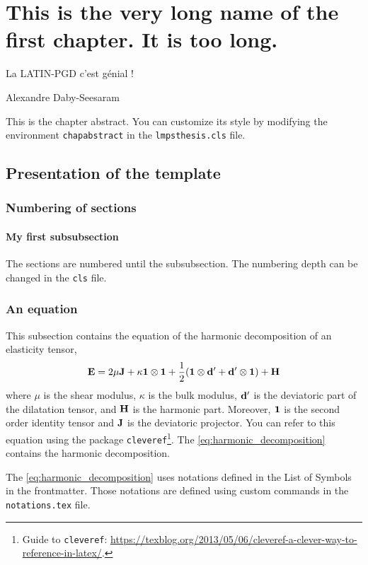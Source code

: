 \chapter[Short name of chapter]{This is the very long name of the first chapter. It is too long.}

{\color{lmpsblue} \epigraph{La LATIN-PGD c'est génial !}{Alexandre Daby-Seesaram}}

\begin{chapabstract}
    This is the chapter abstract. You can customize its style by modifying the environment \texttt{chapabstract} in the \texttt{lmpsthesis.cls} file.
    \lipsum[1]
\end{chapabstract}

\minitoc

\section{Presentation of the template}%
\label{sec:presentation_of_the_template}

\subsection{Numbering of sections}
\label{sub:numbering_of_sections}

\subsubsection{My first subsubsection}
\label{ssub:my_first_subsubsection}

The sections are numbered until the subsubsection.
The numbering depth can be changed in the \texttt{cls} file.

\subsection{An equation}%
\label{sub:an_equation}

This subsection contains the equation of the harmonic decomposition of an elasticity tensor,
\begin{equation}\label{eq:harmonic_decomposition}
    \ela =
        2 \mu \J +
        \kappa \id{2} \otimes \id{2} +
        \frac{1}{2} (\id{2} \otimes \dev{\dil} + \dev{\dil} \otimes \id{2}) +
        \har
\end{equation}
where
    $\mu$ is the shear modulus,
    $\kappa$ is the bulk modulus,
    $\mathbf{d}'$ is the deviatoric part of the dilatation tensor, and
    $\mathbf{H}$ is the harmonic part.
Moreover, $\id{2}$ is the second order identity tensor and $\mathbf{J}$ is the deviatoric projector.
You can refer to this equation using the package \texttt{cleveref}\footnote{Guide to \texttt{cleveref}: \url{https://texblog.org/2013/05/06/cleveref-a-clever-way-to-reference-in-latex/}.}.
The \cref{eq:harmonic_decomposition} contains the harmonic decomposition.
\begin{remark}
    The \cref{eq:harmonic_decomposition} uses notations defined in the List of Symbols in the frontmatter.
    Those notations are defined using custom commands in the \texttt{notations.tex} file.
\end{remark}


